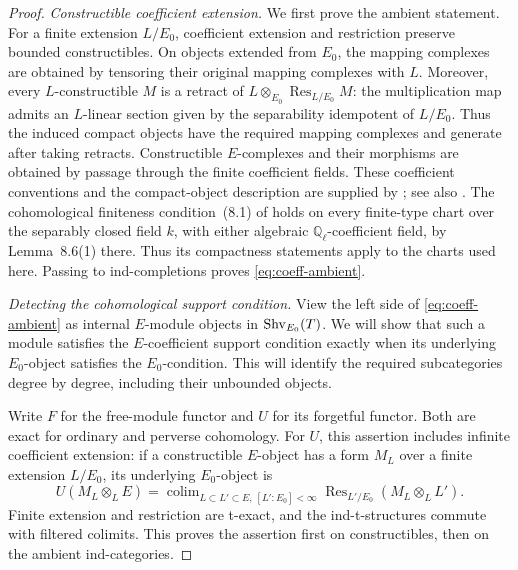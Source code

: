 \begin{proof}
\emph{Constructible coefficient extension.}
We first prove the ambient statement. For a finite extension
$L/E_0$, coefficient extension and restriction preserve bounded
constructibles. On objects extended from $E_0$, the mapping complexes
are obtained by tensoring their original mapping complexes with $L$.
Moreover, every $L$-constructible $M$ is a retract of
$L\otimes_{E_0}\operatorname{Res}_{L/E_0}M$: the multiplication map
admits an $L$-linear section given by the separability idempotent of
$L/E_0$. Thus the induced compact objects have the required mapping
complexes and generate after taking retracts. Constructible
$E$-complexes and their morphisms are obtained by passage through the
finite coefficient fields. These coefficient conventions and the
compact-object description are supplied by
\cite[Proposition~5.2, Theorem~7.7, Lemma~7.9, Proposition~8.2 and
Corollary~8.3]{HemoRicharzScholbach}; see also
\cite[\S2]{HansenScholze}. The cohomological finiteness
condition~(8.1) of \cite{HemoRicharzScholbach} holds on every finite-type
chart over the separably closed field $k$, with either algebraic
$\mathbb Q_\ell$-coefficient field, by Lemma~8.6(1) there. Thus its
compactness statements apply to the charts used here.
Passing to ind-completions proves
\eqref{eq:coeff-ambient}.

\emph{Detecting the cohomological support condition.}
View the left side of \eqref{eq:coeff-ambient} as internal $E$-module
objects in $\operatorname{Shv}_{E_0}(T)$. We will show that such a module satisfies
the $E$-coefficient support condition exactly when its underlying
$E_0$-object satisfies the $E_0$-condition. This will identify the
required subcategories degree by degree, including their unbounded
objects.

Write $F$ for the free-module functor and $U$ for its forgetful
functor. Both are exact for ordinary and perverse cohomology. For $U$,
this assertion includes infinite coefficient
extension: if a constructible $E$-object has a form $M_L$ over a finite
extension $L/E_0$, its underlying $E_0$-object is
\begin{equation}\label{eq:coeff-forgetful}
 U(M_L\otimes_L E)=
 \mathop{\operatorname{colim}}_{L\subset L'\subset E,
                              \,[L':E_0]<\infty}
 \operatorname{Res}_{L'/E_0}(M_L\otimes_L L').
\end{equation}
Finite extension and restriction are t-exact, and the ind-t-structures
commute with filtered colimits. This proves the assertion first on
constructibles, then on the ambient ind-categories.


\end{proof}
